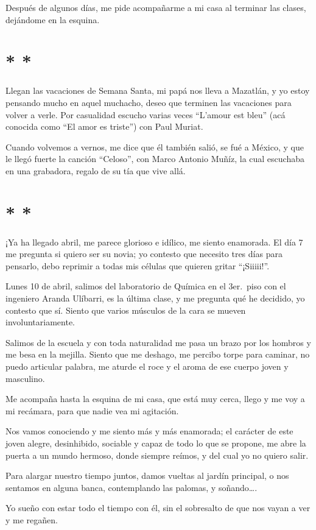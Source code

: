 \documentclass[letterpaper, 12pt]{book}
\begin{document}
Después de algunos días, me pide acompañarme a mi casa al terminar las clases, dejándome en la esquina. 

\section*{\centering * * *}
Llegan las vacaciones de Semana Santa, mi papá nos lleva a Mazatlán, y yo estoy pensando mucho en aquel muchacho, deseo que terminen las vacaciones para volver a verle. Por casualidad escucho varias veces ``L'amour est bleu'' (acá conocida como ``El amor es triste'') con Paul Muriat. 

Cuando volvemos a vernos, me dice que él también salió, se fué a  México, y que le llegó fuerte la canción ``Celoso'', con Marco Antonio Muñíz, la cual escuchaba en una grabadora, regalo de su tía que vive allá. 

\section*{\centering * * *}
¡Ya ha llegado abril, me parece glorioso e idílico, me siento enamorada. El día 7 me pregunta si quiero ser su novia; yo contesto que necesito tres días para pensarlo, debo reprimir a todas mis células que quieren gritar ``¡Siiiii!''.

Lunes 10 de abril, salimos del laboratorio de Química en el 3er.\ piso con el ingeniero Aranda Ulíbarri, es la última clase, y me pregunta qué he decidido, yo contesto que sí. Siento que varios músculos de la cara se mueven involuntariamente.

Salimos de la escuela y con toda naturalidad me pasa un brazo por los hombros y me besa en la mejilla. Siento que me deshago, me percibo torpe para caminar, no puedo articular palabra, me aturde el roce y el aroma de ese cuerpo joven y masculino.

Me acompaña hasta la esquina de mi casa, que está muy cerca, llego y me voy a mi recámara, para que nadie vea mi agitación.

Nos vamos conociendo y me siento más y más enamorada; el carácter de este joven alegre, desinhibido, sociable y capaz de todo lo que se propone, me abre la puerta a un mundo hermoso, donde siempre reímos, y del cual yo no quiero salir.

Para alargar nuestro tiempo juntos, damos vueltas al jardín principal, o nos sentamos en alguna banca, contemplando las palomas, y soñando\ldots.

Yo sueño con estar todo el tiempo con él, sin el sobresalto de que nos vayan a ver y me regañen.
\end{document}
